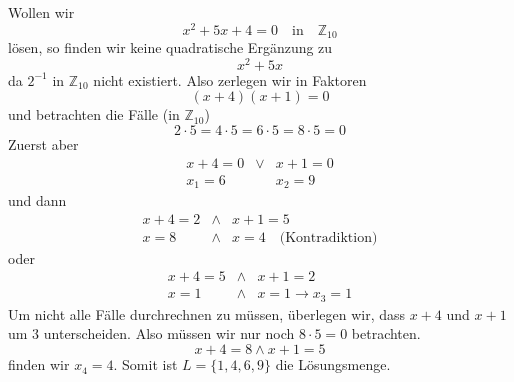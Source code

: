 \documentclass{report}
\begin{document}
Wollen wir
\begin{equation}x^2 + 5x + 4 = 0  \quad \mbox{in} \quad \mathbb{Z}_{10} \end{equation}
lösen, so finden wir keine quadratische Ergänzung zu
\begin{equation}x^2 + 5x\end{equation}
da $2^{-1}$ in $\mathbb{Z}_{10}$ nicht existiert. Also zerlegen wir in Faktoren
\begin{equation}(x + 4)(x + 1) = 0\end{equation}
und betrachten die Fälle (in $\mathbb{Z}_{10}$)
\begin{equation}2 \cdot 5 = 4 \cdot 5 = 6 \cdot 5 = 8 \cdot 5 = 0\end{equation}
Zuerst aber
\begin{eqnarray}x + 4 = 0 & \lor & x + 1 = 0\nonumber \\
x_1 = 6 & & x_2 = 9\end{eqnarray}und dann
\begin{eqnarray}x + 4 = 2 & \land & x + 1 = 5\nonumber \\
x = 8 & \land & x = 4 \quad \mbox{(Kontradiktion)} \end{eqnarray}
oder
\begin{eqnarray}x + 4 = 5 & \land & x + 1 = 2\nonumber \\
x = 1 & \land & x = 1 \to x_3 = 1\end{eqnarray}
Um nicht alle Fälle durchrechnen zu müssen, überlegen wir, dass $x + 4$ und $x + 1$ um $3$ unterscheiden. Also müssen wir nur noch $8 \cdot 5 = 0$ betrachten.
\begin{equation}x + 4 = 8 \land x + 1 = 5\end{equation}
finden wir $x_4 = 4$. Somit ist $L = \{1, 4, 6, 9\}$ die Lösungsmenge.
\end{document}
